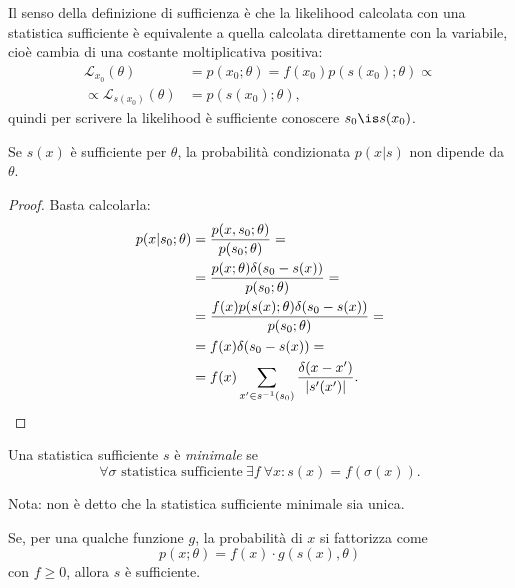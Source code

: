 Il senso della definizione di sufficienza
è che la likelihood calcolata con una statistica sufficiente
è equivalente a quella calcolata direttamente con la variabile,
cioè cambia di una costante moltiplicativa positiva:
\begin{align*}
	\mathcal L_{x_0}(\theta)
	&= p(x_0;\theta) = f(x_0) p(s(x_0);\theta) \propto \\
	\propto \mathcal L_{s(x_0)}(\theta)
	&= p(s(x_0);\theta),
\end{align*}
quindi per scrivere la likelihood è sufficiente conoscere $s_0 \is s(x_0)$.

\begin{theorem}
	Se $s(x)$ è sufficiente per $\theta$,
	la probabilità condizionata $p(x|s)$ non dipende da $\theta$.
\end{theorem}

\begin{proof}
	Basta calcolarla:
	\begin{align*}
		p(x|s_0;\theta)
		&= \frac {p(x,s_0;\theta)} {p(s_0;\theta)} = \\
		&= \frac {p(x;\theta) \delta(s_0-s(x))} {p(s_0;\theta)} = \\
		&= \frac {f(x) p(s(x);\theta) \delta(s_0-s(x))} {p(s_0;\theta)} = \\
		&= f(x) \delta(s_0-s(x)) = \\
		&= f(x) \sum_{x'\in s^{-1}(s_0)} \frac {\delta(x-x')} {|s'(x')|}. \qedhere
	\end{align*}
\end{proof}

\begin{definition}
	Una statistica sufficiente $s$ è \emph{minimale} se
	\begin{equation*}
		\forall \sigma \text{ statistica sufficiente}\ \exists f\ \forall x:
		s(x) = f(\sigma(x)).
	\end{equation*}
\end{definition}
\noindent Nota: non è detto che la statistica sufficiente minimale sia unica.

\begin{theorem}
	\label{th:suffatt}
	Se, per una qualche funzione $g$, la probabilità di $x$ si fattorizza come
	\begin{equation*}
		p(x;\theta) = f(x)\cdot g(s(x),\theta)
	\end{equation*}
	con $f\ge 0$, allora $s$ è sufficiente.
\end{theorem}

